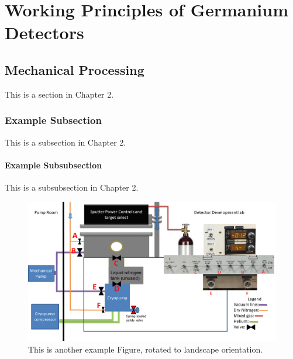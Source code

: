 \chapter{Working Principles of Germanium Detectors}


\section{Mechanical Processing}

This is a section in Chapter 2.


\subsection{Example Subsection}

This is a subsection in Chapter 2.

\subsubsection{Example Subsubsection}

This is a subsubsection in Chapter 2.

\begin{figure}
\includegraphics[width=\textwidth]{figures/sput-flow}
\caption{This is another example Figure, rotated to landscape orientation.}
\label{LandscapeFigure}
\end{figure}
